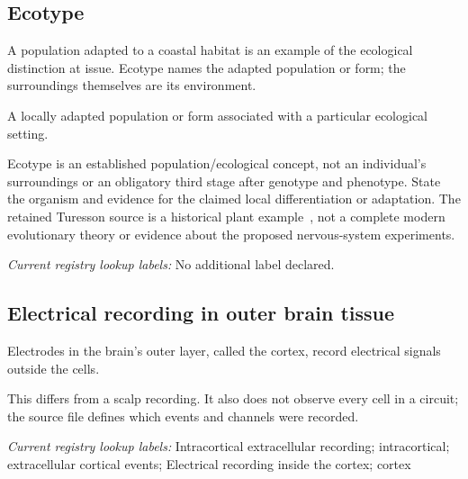 \subsection*{Ecotype}
\noindent A population adapted to a coastal habitat is an example of the ecological distinction at issue. Ecotype names the adapted population or form; the surroundings themselves are its environment.\par
\noindent A locally adapted population or form associated with a particular ecological setting.\par
\noindent Ecotype is an established population/ecological concept, not an individual’s surroundings or an obligatory third stage after genotype and phenotype. State the organism and evidence for the claimed local differentiation or adaptation. The retained Turesson source is a historical plant example~\citep{turesson1922ecotype}, not a complete modern evolutionary theory or evidence about the proposed nervous-system experiments.\par


\noindent\textit{Current registry lookup labels:} No additional label declared.\par

\begin{samepage}
\subsection*{Electrical recording in outer brain tissue}
\noindent Electrodes in the brain’s outer layer, called the cortex, record electrical signals outside the cells.\par
\end{samepage}
\begin{samepage}
\noindent This differs from a scalp recording. It also does not observe every cell in a circuit; the source file defines which events and channels were recorded.\par\nopagebreak[4]

\end{samepage}


\noindent\textit{Current registry lookup labels:} Intracortical extracellular recording; intracortical; extracellular cortical events; Electrical recording inside the cortex; cortex\par

